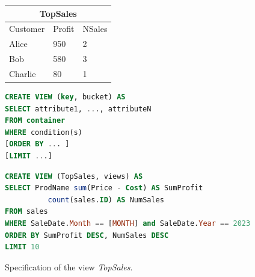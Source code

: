 \documentclass{vldb}
\begin{document}
\begin{figure}
	\setlength\tabcolsep{3.5pt}
	\begin{minipage}{0.19\textwidth}
		\small
		\begin{tabular}{lll}
			\multicolumn{3}{c}{\textbf{TopSales}} \vspace{0.4em}        \\
			\hline                                               
			\multicolumn{1}{|l|}{Customer}   & \multicolumn{1}{l|}{Profit} & \multicolumn{1}{l|}{NSales} \\ \hline
			\multicolumn{1}{|l|}{Alice} & \multicolumn{1}{l|}{950}     & \multicolumn{1}{l|}{2}        \\
			\multicolumn{1}{|l|}{Bob}  & \multicolumn{1}{l|}{580}      & \multicolumn{1}{l|}{3}        \\
			\multicolumn{1}{|l|}{Charlie}   & \multicolumn{1}{l|}{80}      & \multicolumn{1}{l|}{1}        \\ \hline
		\end{tabular}
		\vspace{1em}
		\label{table:topSales}
	\end{minipage} \hfill
	\begin{minipage}{0.27\textwidth}
	\begin{lstlisting}[language=SQL]
CREATE VIEW (key, bucket) AS
SELECT attribute1, ..., attributeN
FROM container
WHERE condition(s) 
[ORDER BY ... ]
[LIMIT ...]
		\end{lstlisting}
		\label{fig:viewSQL}
	\end{minipage}
\end{figure}

\begin{figure}[t]
\begin{lstlisting}[language=SQL]
CREATE VIEW (TopSales, views) AS 
SELECT ProdName sum(Price - Cost) AS SumProfit
	      count(sales.ID) AS NumSales 
FROM sales 
WHERE SaleDate.Month == [MONTH] and SaleDate.Year == 2023
ORDER BY SumProfit DESC, NumSales DESC 
LIMIT 10
\end{lstlisting}
	\caption{Specification of the view \emph{TopSales}.}
	\label{fig:topSalesSQL}
\end{figure}
\end{document}
